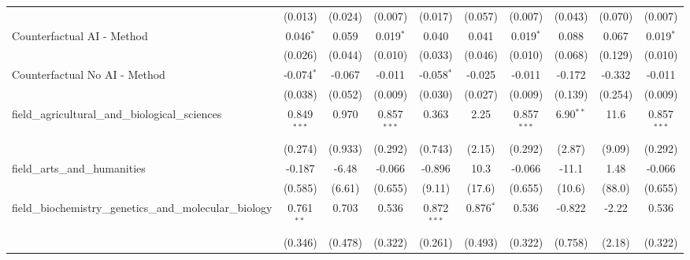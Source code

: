 \begin{tabular}{lccccccccc}
                                                               & (0.013)        & (0.024)       & (0.007)        & (0.017)        & (0.057)      & (0.007)        & (0.043)       & (0.070)       & (0.007)\\   
   Counterfactual AI - Method                                  & 0.046$^{*}$    & 0.059         & 0.019$^{*}$    & 0.040          & 0.041        & 0.019$^{*}$    & 0.088         & 0.067         & 0.019$^{*}$\\   
                                                               & (0.026)        & (0.044)       & (0.010)        & (0.033)        & (0.046)      & (0.010)        & (0.068)       & (0.129)       & (0.010)\\   
   Counterfactual No AI - Method                               & -0.074$^{*}$   & -0.067        & -0.011         & -0.058$^{*}$   & -0.025       & -0.011         & -0.172        & -0.332        & -0.011\\   
                                                               & (0.038)        & (0.052)       & (0.009)        & (0.030)        & (0.027)      & (0.009)        & (0.139)       & (0.254)       & (0.009)\\   
   field\_agricultural\_and\_biological\_sciences              & 0.849$^{***}$  & 0.970         & 0.857$^{***}$  & 0.363          & 2.25         & 0.857$^{***}$  & 6.90$^{**}$   & 11.6          & 0.857$^{***}$\\   
                                                               & (0.274)        & (0.933)       & (0.292)        & (0.743)        & (2.15)       & (0.292)        & (2.87)        & (9.09)        & (0.292)\\   
   field\_arts\_and\_humanities                                & -0.187         & -6.48         & -0.066         & -0.896         & 10.3         & -0.066         & -11.1         & 1.48          & -0.066\\   
                                                               & (0.585)        & (6.61)        & (0.655)        & (9.11)         & (17.6)       & (0.655)        & (10.6)        & (88.0)        & (0.655)\\   
   field\_biochemistry\_genetics\_and\_molecular\_biology      & 0.761$^{**}$   & 0.703         & 0.536          & 0.872$^{***}$  & 0.876$^{*}$  & 0.536          & -0.822        & -2.22         & 0.536\\   
                                                               & (0.346)        & (0.478)       & (0.322)        & (0.261)        & (0.493)      & (0.322)        & (0.758)       & (2.18)        & (0.322)\\   

\end{tabular}
